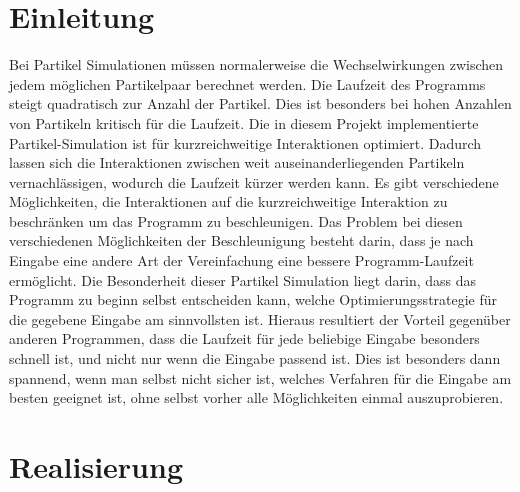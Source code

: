 \documentclass[
	12pt,
	a4paper,
	BCOR10mm,
	DIV14,
	headsepline,
]{scrreprt}
\begin{document}
\tableofcontents

\chapter{Einleitung}
\label{Einleitung}

	Bei Partikel Simulationen müssen normalerweise die Wechselwirkungen zwischen jedem möglichen Partikelpaar berechnet werden. Die Laufzeit des Programms steigt quadratisch zur Anzahl der Partikel. Dies ist besonders bei hohen Anzahlen von Partikeln kritisch für die Laufzeit. Die in diesem Projekt implementierte Partikel-Simulation ist für kurzreichweitige Interaktionen optimiert. Dadurch lassen sich die Interaktionen zwischen weit auseinanderliegenden Partikeln vernachlässigen, wodurch die Laufzeit kürzer werden kann. Es gibt verschiedene Möglichkeiten, die Interaktionen auf die kurzreichweitige Interaktion zu beschränken um das Programm zu beschleunigen. Das Problem bei diesen verschiedenen Möglichkeiten der Beschleunigung besteht darin, dass je nach Eingabe eine andere Art der Vereinfachung eine bessere Programm-Laufzeit ermöglicht. Die Besonderheit dieser Partikel Simulation liegt darin, dass das Programm zu beginn selbst entscheiden kann, welche Optimierungsstrategie für die gegebene Eingabe am sinnvollsten ist. Hieraus resultiert der Vorteil gegenüber anderen Programmen, dass die Laufzeit für jede beliebige Eingabe besonders schnell ist, und nicht nur wenn die Eingabe passend ist. Dies ist besonders dann spannend, wenn man selbst nicht sicher ist, welches Verfahren für die Eingabe am besten geeignet ist, ohne selbst vorher alle Möglichkeiten einmal auszuprobieren.

\chapter{Realisierung}
\label{Realisierung}
\end{document}
